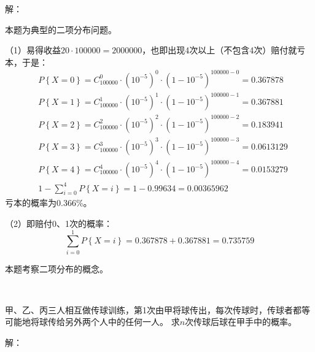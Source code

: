 解：

本题为典型的二项分布问题。

（1）易得收益$20\cdot 100000=2000000$，也即出现4次以上（不包含4次）赔付就亏本，于是：
\begin{align*}
&P\left\{ X=0 \right\} =C_{100000}^{0}\cdot \left( 10^{-5} \right) ^0\cdot \left( 1-10^{-5} \right) ^{100000-0}=0.367878 \\
&P\left\{ X=1 \right\} =C_{100000}^{1}\cdot \left( 10^{-5} \right) ^1\cdot \left( 1-10^{-5} \right) ^{100000-1}=0.367881 \\
&P\left\{ X=2 \right\} =C_{100000}^{2}\cdot \left( 10^{-5} \right) ^2\cdot \left( 1-10^{-5} \right) ^{100000-2}=0.183941 \\
&P\left\{ X=3 \right\} =C_{100000}^{3}\cdot \left( 10^{-5} \right) ^3\cdot \left( 1-10^{-5} \right) ^{100000-3}=0.0613129 \\
&P\left\{ X=4 \right\} =C_{100000}^{4}\cdot \left( 10^{-5} \right) ^4\cdot \left( 1-10^{-5} \right) ^{100000-4}=0.0153279 \\
&1-\sum_{i=0}^4{P\left\{ X=i \right\}}=1-0.99634=0.00365962
\end{align*}
亏本的概率为0.366\%。

（2）即赔付0、1次的概率：
\[
\sum_{i=0}^1{P\left\{ X=i \right\}}=0.367878+0.367881=0.735759
\]

\begin{tcolorbox}
本题考察二项分布的概念。
\end{tcolorbox}

~

\begin{example}
甲、乙、丙三人相互做传球训练，第1次由甲将球传出，每次传球时，传球者都等可能地将球传给另外两个人中的任何一人。
求$n$次传球后球在甲手中的概率。
\end{example}

解：

